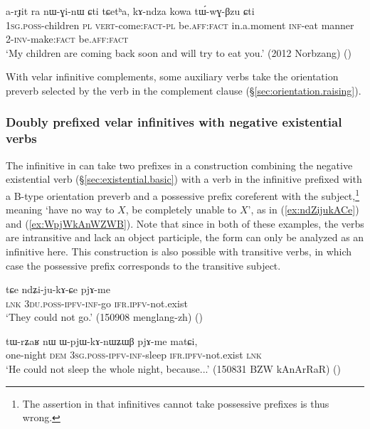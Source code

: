   \begin{exe}
\ex \label{ex:kAndza.kowa.tWwGBzu}
\gll   a-rɟit ra nɯ-ɣi-nɯ ɕti tɕetʰa, kɤ-ndza kowa tɯ́-wɣ-βzu ɕti \\
 \textsc{1sg}.\textsc{poss}-children \textsc{pl} \textsc{vert}-come:\textsc{fact}-\textsc{pl} be.\textsc{aff}:\textsc{fact} in.a.moment \textsc{inf}-eat manner 2-\textsc{inv}-make:\textsc{fact}  be.\textsc{aff}:\textsc{fact} \\
 \glt `My children are coming back soon and will try to eat you.' (2012 Norbzang) ()
 \end{exe} 
 
With velar infinitive complements, some auxiliary verbs take the orientation preverb selected by the verb in the complement clause (§\ref{sec:orientation.raising}).
 

\subsubsection{Doubly prefixed velar infinitives with negative existential verbs} \label{sec:inf.exist}
The infinitive in  can take two prefixes in a construction combining the negative existential verb  (§\ref{sec:existential.basic}) with a verb in the infinitive prefixed with a B-type orientation preverb and a possessive prefix coreferent with the subject,\footnote{The assertion in \citet[228]{jacques16complementation} that infinitives cannot take possessive prefixes is thus wrong.} meaning `have no way to $X$, be completely unable to $X$', as in (\ref{ex:ndZijukACe}) and (\ref{ex:WpjWkAnWZWB}). Note that since in both of these examples, the verbs are intransitive and lack an object participle, the  form can only be analyzed as an infinitive here. This construction is also possible with transitive verbs, in which case the possessive prefix corresponds to the transitive subject.

\begin{exe}
\ex \label{ex:ndZijukACe}
\gll tɕe ndʑi-ju-kɤ-ɕe pjɤ-me \\
\textsc{lnk} \textsc{3du}.\textsc{poss}-\textsc{ipfv}-\textsc{inf}-go \textsc{ifr}.\textsc{ipfv}-not.exist \\
\glt `They could not go.' (150908 menglang-zh) ()
\end{exe} 

\begin{exe}
\ex \label{ex:WpjWkAnWZWB}
\gll tɯ-rʑaʁ nɯ ɯ-pjɯ-kɤ-nɯʑɯβ pjɤ-me matɕi, \\
one-night \textsc{dem} \textsc{3sg}.\textsc{poss}-\textsc{ipfv}-\textsc{inf}-sleep \textsc{ifr}.\textsc{ipfv}-not.exist \textsc{lnk} \\
\glt `He could not sleep the whole night, because...' (150831 BZW kAnArRaR)
()
\end{exe}

